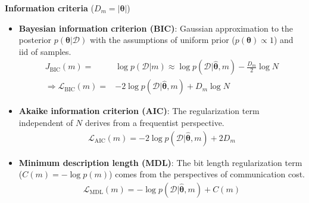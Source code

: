 \textbf{Information criteria} ($D_m=|\bm{\theta}|$)
\begin{itemize}
    \item \textbf{Bayesian information criterion (BIC)}: 
    Gaussian approximation to the posterior $p(\bm{\theta}|\mathcal{D})$ with the assumptions of 
    {uniform prior ($p(\bm{\theta})\propto 1$) and iid of samples}.
    \begin{align}
        J_\text{BIC}(m)=&\log{p(\mathcal{D}|m)}\approx\log{p(\mathcal{D}|\hat{\bm{\theta}},m)-\frac{D_m}{2}\log{N}}\\
        \Rightarrow
        \mathcal{L}_\text{BIC}(m)=&-2\log{p(\mathcal{D}|\hat{\bm{\theta}},m)+D_m\log{N}}
    \end{align}
    
    \item \textbf{Akaike information criterion (AIC)}: 
    The regularization term independent of $N$ derives from a frequentist perspective.
    \begin{gather}
        \mathcal{L}_\text{AIC}(m)=-2\log{p(\mathcal{D}|\hat{\bm{\theta}},m)+2D_m}
    \end{gather}
    
    \item \textbf{Minimum description length (MDL)}:
    The bit length regularization term ($C(m)=-\log{p(m)}$) comes from the perspectives of communication cost.
    \begin{gather}
        \mathcal{L}_\text{MDL}(m)=-\log{p(\mathcal{D}|\hat{\bm{\theta}},m)+C(m)}
    \end{gather}
    
\end{itemize}

%     



